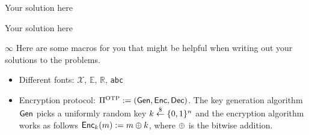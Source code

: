 \documentclass[a4paper,10pt]{article}
\begin{document}

\begin{question}{1}
Your solution here
\end{question}

\begin{question}{5}
Your solution here
\end{question}

\begin{question}{$\infty$}
Here are some macros for you that might be helpful when writing out your solutions to the problems.

\begin{itemize}
\item Different fonts: $\mathcal{X}$, $\mathbb{E}$, $\mathbb{R}$, \texttt{abc}
\item Encryption protocol: $\Pi^{\text{OTP}}:=\left( \mathsf{Gen}, \mathsf{Enc}, \mathsf{Dec} \right)$. The key generation algorithm $\mathsf{Gen}$ picks a uniformly random key $k\overset{\$}{\gets}\{0,1\}^n$ and the encryption algorithm works as follows $\mathsf{Enc}_k(m):=m\oplus k$, where $\oplus$ is the bitwise addition.
\end{itemize}


\end{question}
\end{document}
